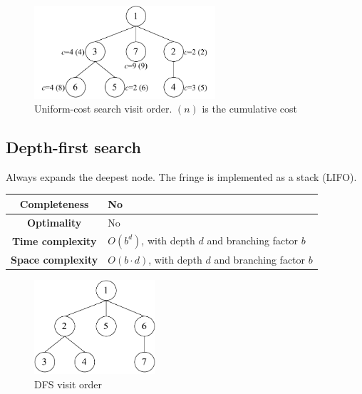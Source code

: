 \begin{figure}[h]
    \centering
    \includegraphics[width=0.60\textwidth]{img/_ucs.pdf}
    \caption{Uniform-cost search visit order. $(n)$ is the cumulative cost}
\end{figure}


\subsection{Depth-first search}
Always expands the deepest node. The fringe is implemented as a stack (LIFO).

\begin{center}
    \def\arraystretch{1.2}
    \begin{tabular}{c | m{10cm}}
        \hline
        \textbf{Completeness} & No \\
        \hline
        \textbf{Optimality} & No \\
        \hline
        \textbf{Time complexity}
            & $O(b^d)$, with depth $d$ and branching factor $b$ \\
        \hline
        \textbf{Space complexity}
            & $O(b \cdot d)$, with depth $d$ and branching factor $b$ \\
        \hline
    \end{tabular}
\end{center}

\begin{figure}[h]
    \centering
    \includegraphics[width=0.40\textwidth]{img/_dfs.pdf}
    \caption{DFS visit order}
\end{figure}